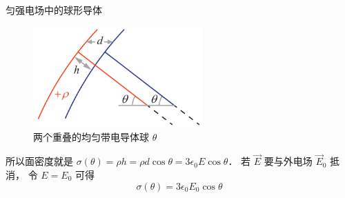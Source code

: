 \begin{exam}{匀强电场中的球形导体}
\begin{figure}[ht]
\centering
\includegraphics[width=6.5cm]{./figures/CndCtr2.pdf}
\caption{两个重叠的均匀带电导体球 $\theta$} \label{CndCtr_fig2}
\end{figure}

所以面密度就是 $\sigma(\theta) = \rho h = \rho d\cos\theta = 3\epsilon_0 E \cos\theta$． 若 $\vec E$ 要与外电场 $\vec E_0$ 抵消， 令 $E = E_0$ 可得
\begin{equation}
\sigma(\theta) = 3\epsilon_0 E_0 \cos\theta
\end{equation}
\end{exam}

